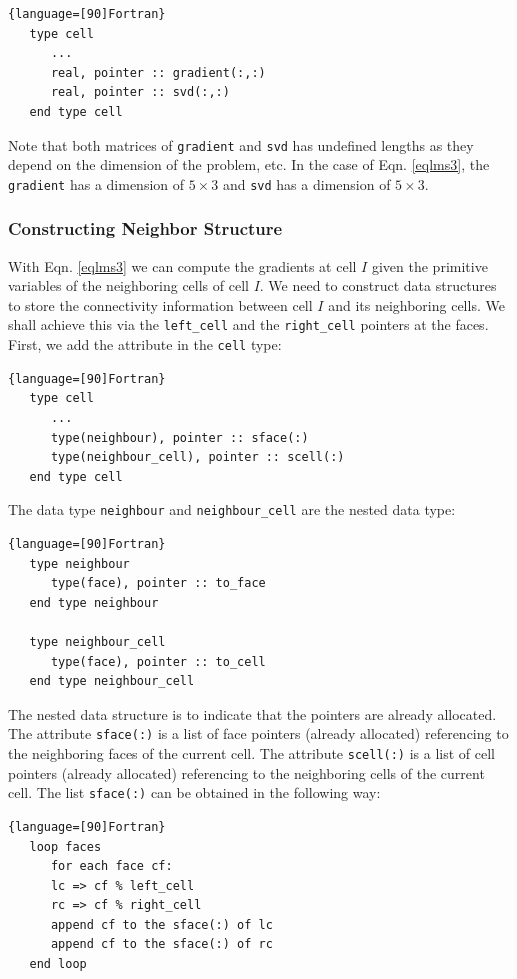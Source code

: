 \documentclass[12pt, letterpaper]{report}
\begin{document}
\begin{lstlisting}{language=[90]Fortran}
   type cell
      ...
      real, pointer :: gradient(:,:)
      real, pointer :: svd(:,:)
   end type cell
\end{lstlisting}

Note that both matrices of \verb+gradient+ and \verb+svd+ has undefined lengths as they depend on
the dimension of the problem, etc. In the case of Eqn. \ref{eqlms3}, the \verb+gradient+ has a
dimension of $5\times3$ and \verb+svd+ has a dimension of $5\times3$.


\subsubsection{Constructing Neighbor Structure}

With Eqn. \ref{eqlms3} we can compute the gradients at cell $I$ given the primitive variables of
the neighboring cells of cell $I$. We need to construct data structures to store the connectivity
information between cell $I$ and its neighboring cells. We shall achieve this via the
\verb+left_cell+ and the \verb+right_cell+ pointers at the faces. First, we add the attribute in the
\verb+cell+ type:

\begin{lstlisting}{language=[90]Fortran}
   type cell
      ...
      type(neighbour), pointer :: sface(:)
      type(neighbour_cell), pointer :: scell(:)
   end type cell
\end{lstlisting}

The data type \verb+neighbour+ and \verb+neighbour_cell+ are the nested data type:

\begin{lstlisting}{language=[90]Fortran}
   type neighbour
      type(face), pointer :: to_face
   end type neighbour

   type neighbour_cell
      type(face), pointer :: to_cell
   end type neighbour_cell
\end{lstlisting}

The nested data structure is to indicate that the pointers are already allocated. The attribute
\verb+sface(:)+ is a list of face pointers (already allocated) referencing to the neighboring faces
of the current cell. The attribute \verb+scell(:)+ is a list of cell pointers (already allocated)
referencing to the neighboring cells of the current cell. The list \verb+sface(:)+ can be obtained in
the following way:

\begin{lstlisting}{language=[90]Fortran}
   loop faces
      for each face cf:
      lc => cf % left_cell
      rc => cf % right_cell
      append cf to the sface(:) of lc
      append cf to the sface(:) of rc
   end loop
\end{lstlisting}
\end{document}
